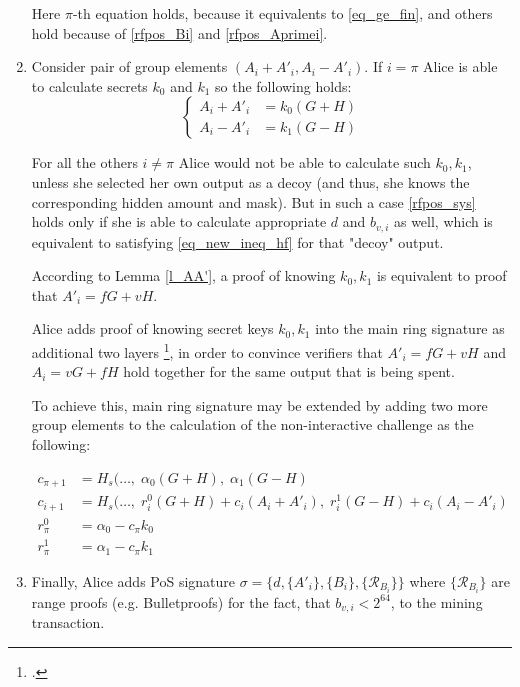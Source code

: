 \documentclass{article}
\numberwithin{figure}{section}
\begin{document}
\begin{enumerate}
    Here $\pi$-th equation holds, because it equivalents to \eqref{eq_ge_fin}, and others hold because of \eqref{rfpos_Bi} and \eqref{rfpos_Aprimei}.
    
    \item Consider pair of group elements $(A_i+A'_i, A_i-A'_i)$. If $i = \pi$ Alice is able to calculate secrets $k_0$ and $k_1$ so the following holds:
    \begin{equation*}
    \left\{ \begin{aligned} 
        A_i + A'_i &= k_0 (G + H) \\
        A_i - A'_i &= k_1 (G - H)
    \end{aligned} \right.
    \end{equation*}
    
    For all the others $i \neq \pi$ Alice would not be able to calculate such $k_0, k_1$, unless she selected her own output as a decoy (and thus, she knows the corresponding hidden amount and mask). But in such a case \eqref{rfpos_sys} holds only if she is able to calculate appropriate $d$ and $b_{v,i}$ as well, which is equivalent to satisfying \eqref{eq_new_ineq_hf} for that "decoy" output.
    
    According to Lemma \ref{l_AA'}, a proof of knowing $k_0, k_1$ is equivalent to proof that $A'_i = fG + vH$.
    
    Alice adds proof of knowing secret keys $k_0, k_1$ into the main ring signature as additional two layers \footcite[Here we're using terminology and ideas from Multi-layered Linkable Spontaneous Anonymous Group signature proposed in][]{MRL0005}, in order to convince verifiers that $A'_i = fG + vH$ and $A_i = vG + fH$ hold together for the same output that is being spent.
    
    To achieve this, main ring signature may be extended by adding two more group elements to the calculation of the non-interactive challenge as the following:
    
    \begin{equation*} \begin{aligned}
        c_{\pi+1} &= H_s(\dots, \; \alpha_0 (G + H), \; \alpha_1 (G - H) \\
        c_{i+1} &= H_s(\dots, \; r^0_i (G + H) + c_i (A_i + A'_i), \; r^1_i (G - H) + c_i (A_i - A'_i) \\
        r^0_\pi &= \alpha_0 - c_\pi k_0 \\
        r^1_\pi &= \alpha_1 - c_\pi k_1
     \end{aligned} \end{equation*}
     
     \item Finally, Alice adds PoS signature $\sigma = \{ d, \{A'_i\}, \{B_i\}, \{\mathcal{R}_B_i\} \}$ where $\{\mathcal{R}_B_i\}$ are range proofs (e.g. Bulletproofs) for the fact, that $b_{v,i} < 2^{64}$, to the mining transaction.
\end{enumerate}
\end{document}
